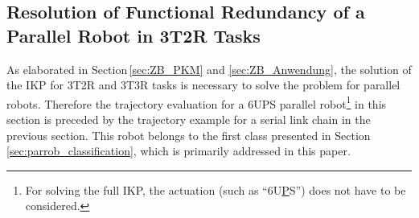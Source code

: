 \documentclass[robotics,article,accept,moreauthors,pdftex]{Definitions/mdpi}
\newcommand{\bm}[1]{\boldsymbol{#1}}
\newcommand{\transp}[0]{{\mathrm{T}}}
\begin{document}
\subsection{Resolution of Functional Redundancy of a Parallel Robot in 3T2R Tasks}
\label{sec:Ergebnisse_IK_Parallel}


As elaborated in Section\,\ref{sec:ZB_PKM} and \ref{sec:ZB_Anwendung}, the solution of the IKP for 3T2R and 3T3R tasks is necessary to solve the problem for parallel robots.
Therefore\added[id=Sp]{,} the trajectory evaluation for a 6UPS parallel robot\footnote{For solving the full IKP, the actuation (such as ``6U\underline{P}S'') does not have to be considered.} in this section is preceded by the trajectory example for a serial link chain in the previous section.
This robot belongs to the first class presented in Section\,\ref{sec:parrob_classification}, which is primarily addressed in this paper.

\end{document}
